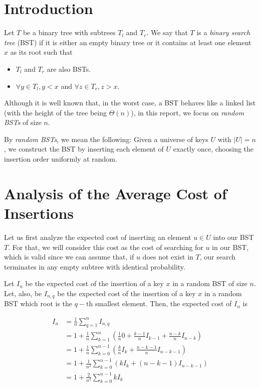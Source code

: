 \section{Introduction}  
Let $T$ be a binary tree with subtrees $T_l$ and $T_r$. We say that $T$ is a \textit{binary search tree} (BST) if it is either an empty binary tree or it contains at least one element $x$ as its root such that  

\begin{itemize}  
    \item $T_l$ and $T_r$ are also BSTs.  
    \item $\forall y \in T_l, y < x$ and $\forall z \in T_r, z > x$.  
\end{itemize}  

Although it is well known that, in the worst case, a BST behaves like a linked list (with the height of the tree being $\Theta(n)$), in this report, we focus on \textit{random BSTs} of size $n$.  

By \textit{random BSTs}, we mean the following: Given a universe of keys $U$ with $|U| = n$, we construct the BST by inserting each element of $U$ exactly once, choosing the insertion order uniformly at random.

\section{Analysis of the Average Cost of Insertions}
Let us first analyze the expected cost of inserting an element \( u \in U \) into our BST \( T \). For that, we will consider this cost as the cost of searching for \( u \) in our BST, which is valid since we can assume that, if $u$ does not exist in $T$, our search terminates in any empty subtree with identical probability. 

Let $I_n$ be the expected cost of the insertion of a key $x$ in a random BST of size $n$. Let, also, be $I_{n,q}$ be the expected cost of the insertion of a key $x$ in a random BST which root is the $q-\text{th}$ smallest element. Then, the expected cost of $I_n$ is

\begin{align*}
    I_n &= \frac{1}{n}\sum\limits_{q = 1}^{n} I_{n,q} \\
        &= 1 + \frac{1}{n}\sum\limits_{k=1}^{n} (\frac{1}{n} 0 + \frac{k-1}{n} I_{k-1} + \frac{n-k}{n} I_{n-k}) \\
        &= 1 + \frac{1}{n}\sum\limits_{k=0}^{n-1} (\frac{k}{n} I_{k} + \frac{n-k-1}{n} I_{n-k-1}) \\
        &= 1 + \frac{1}{n^2}\sum\limits_{k=0}^{n-1} (k I_{k} + (n-k-1)I_{n-k-1}) \\
        &= 1 + \frac{2}{n^2}\sum\limits_{k=0}^{n-1} k I_{k}
\end{align*}

